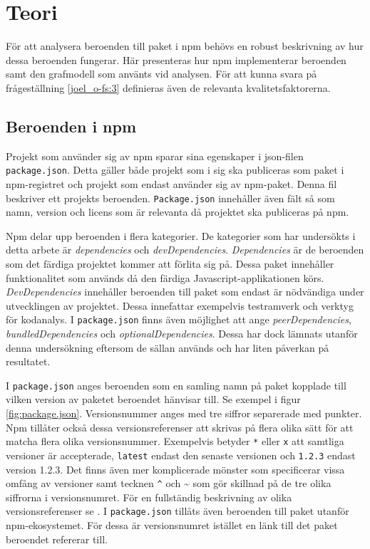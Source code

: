 \section{Teori}
\label{sec:joel_o-theory}
För att analysera beroenden till paket i npm behövs en robust beskrivning av hur dessa beroenden fungerar. Här presenteras hur npm implementerar beroenden samt den grafmodell som använts vid analysen. För att kunna svara på frågeställning \ref{joel_o-fs:3} definieras även de relevanta kvalitetsfaktorerna.

\subsection{Beroenden i npm}
Projekt som använder sig av npm sparar sina egenskaper i json-filen \texttt{package.json}.\cite{npm-package.json} Detta gäller både projekt som i sig ska publiceras som paket i npm-registret och projekt som endast använder sig av npm-paket. Denna fil beskriver ett projekts beroenden. \texttt{Package.json} innehåller även fält så som namn, version och licens som är relevanta då projektet ska publiceras på npm.

Npm delar upp beroenden i flera kategorier. De kategorier som har undersökts i detta arbete är \textit{dependencies} och \textit{devDependencies}. \textit{Dependencies} är de beroenden som det färdiga projektet kommer att förlita sig på. Dessa paket innehåller funktionalitet som används då den färdiga Javascript-applikationen körs. \textit{DevDependencies} innehåller beroenden till paket som endast är nödvändiga under utvecklingen av projektet. Dessa innefattar exempelvis testramverk och verktyg för kodanalys. I \texttt{package.json} finns även möjlighet att ange \textit{peerDependencies}, \textit{bundledDependencies} och \textit{optionalDependencies}. Dessa har dock lämnats utanför denna undersökning eftersom de sällan används och har liten påverkan på resultatet.

I \texttt{package.json} anges beroenden som en samling namn på paket kopplade till vilken version av paketet beroendet hänvisar till. Se exempel i figur \ref{fig:package.json}. Versionsnummer anges med tre siffror separerade med punkter.\cite{npm-semver} Npm tillåter också dessa versionsreferenser att skrivas på flera olika sätt för att matcha flera olika versionsnummer. Exempelvis betyder \texttt{*} eller \texttt{x} att samtliga versioner är accepterade, \texttt{latest} endast den senaste versionen och \texttt{1.2.3} endast version 1.2.3. Det finns även mer komplicerade mönster som specificerar vissa omfång av versioner samt tecknen \texttt{\^} och {\textasciitilde} som gör skillnad på de tre olika siffrorna i versionsnumret. För en fullständig beskrivning av olika versionsreferenser se \cite{npm-semver}. I \texttt{package.json} tillåts även beroenden till paket utanför npm-ekosystemet. För dessa är versionsnumret istället en länk till det paket beroendet refererar till.

